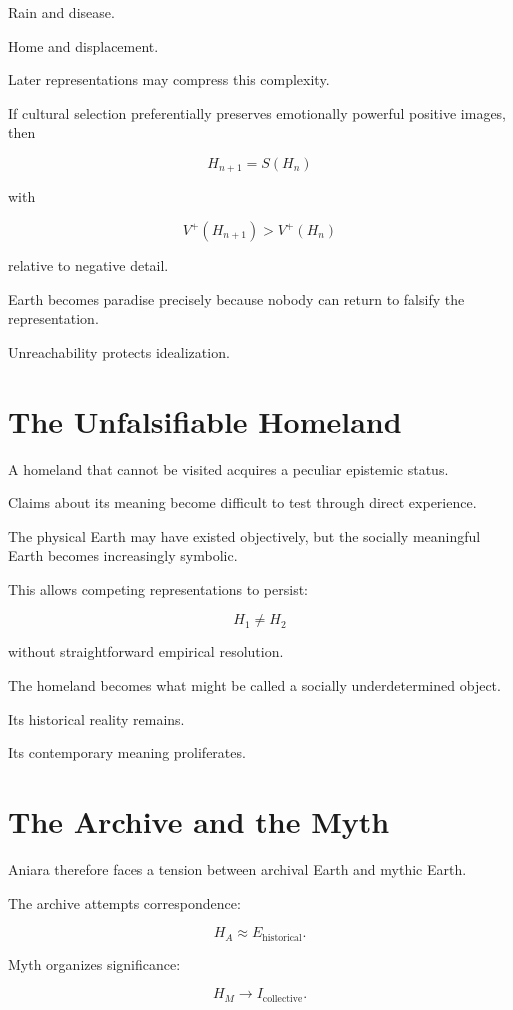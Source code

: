 \documentclass[11pt,oneside]{book}
\theoremstyle{definition}
\theoremstyle{remark}
\begin{document}
Rain and disease.

Home and displacement.

Later representations may compress this complexity.

If cultural selection preferentially preserves emotionally powerful positive images, then

\[
H_{n+1}
=
S(H_n)
\]

with

\[
V^+(H_{n+1})
>
V^+(H_n)
\]

relative to negative detail.

Earth becomes paradise precisely because nobody can return to falsify the representation.

Unreachability protects idealization.

\section{The Unfalsifiable Homeland}

A homeland that cannot be visited acquires a peculiar epistemic status.

Claims about its meaning become difficult to test through direct experience.

The physical Earth may have existed objectively, but the socially meaningful Earth becomes increasingly symbolic.

This allows competing representations to persist:

\[
H_1\neq H_2
\]

without straightforward empirical resolution.

The homeland becomes what might be called a socially underdetermined object.

Its historical reality remains.

Its contemporary meaning proliferates.

\section{The Archive and the Myth}

Aniara therefore faces a tension between archival Earth and mythic Earth.

The archive attempts correspondence:

\[
H_A
\approx
E_{\mathrm{historical}}.
\]

Myth organizes significance:

\[
H_M
\rightarrow
I_{\mathrm{collective}}.
\]
\end{document}
